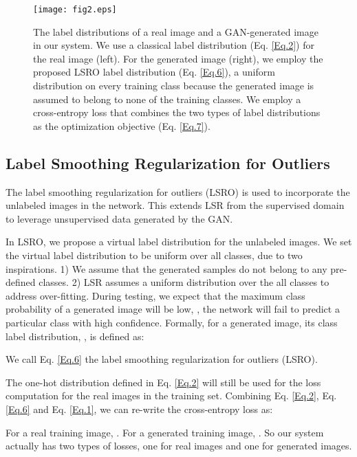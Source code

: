 \documentclass[10pt,twocolumn,letterpaper]{article}
\begin{document}
\begin{figure}[t]
\begin{center}
\texttt{[image: fig2.eps]}
\end{center}
   \caption{The label distributions of a real image and a GAN-generated image in our system. We use a classical label distribution (Eq. \ref{Eq.2}) for the real image (left). For the generated image (right), we employ the proposed LSRO label distribution (Eq. \ref{Eq.6}), \eg a uniform distribution on every training class because the generated image is assumed to belong to none of the training classes. We employ a cross-entropy loss that combines the two types of label distributions as the optimization objective (Eq. \ref{Eq.7}). }
\label{fig:method}
\end{figure} 

\subsection{Label Smoothing Regularization for Outliers}
The label smoothing regularization for outliers (LSRO) is used to incorporate the unlabeled images in the network. This extends LSR from the supervised domain to leverage unsupervised data generated by the GAN. 


In LSRO, we propose a virtual label distribution for the unlabeled images. We set the virtual label distribution to be uniform over all classes, due to two inspirations. 1) We assume that the generated samples do not belong to any pre-defined classes. 2) LSR assumes a uniform distribution over the all classes to address over-fitting. During testing, we expect that the maximum class probability of a generated image will be low, \ie, the network will fail to predict a particular class with high confidence. Formally, for a generated image, its class label distribution, , is defined as:

We call Eq. \ref{Eq.6} the label smoothing regularization for outliers (LSRO). 

The one-hot distribution defined in Eq. \ref{Eq.2} will still be used for the loss computation for the real images in the training set. 
Combining Eq. \ref{Eq.2}, Eq. \ref{Eq.6} and Eq. \ref{Eq.1}, we can re-write the cross-entropy loss as:

For a real training image, . For a generated training image, . So our system actually has two types of losses, one for real images and one for generated images. 
\end{document}

